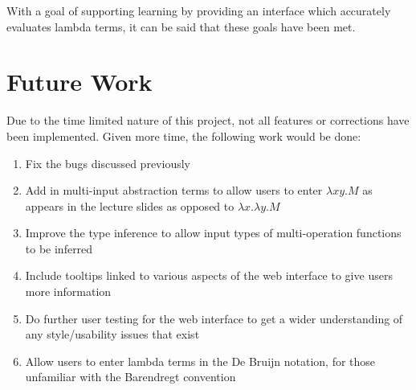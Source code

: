 \documentclass[a4paper,12pt]{report}
\begin{document}
With a goal of supporting learning by providing an interface which accurately evaluates lambda terms, it can be said that these goals have been met.\\

\section{Future Work}
Due to the time limited nature of this project, not all features or corrections have been implemented. Given more time, the following work would be done:

\begin{enumerate}
	\item Fix the bugs discussed previously
	\item Add in multi-input abstraction terms to allow users to enter $\lambda xy.M$ as appears in the lecture slides \cite{Gay2019} as opposed to $\lambda x.\lambda y.M$
	\item Improve the type inference to allow input types of multi-operation functions to be inferred
	\item Include tooltips linked to various aspects of the web interface to give users more information
	\item Do further user testing for the web interface to get a wider understanding of any style/usability issues that exist 
	\item Allow users to enter lambda terms in the De Bruijn notation, for those unfamiliar with the Barendregt convention
\end{enumerate}

\printbibliography
\end{document}
